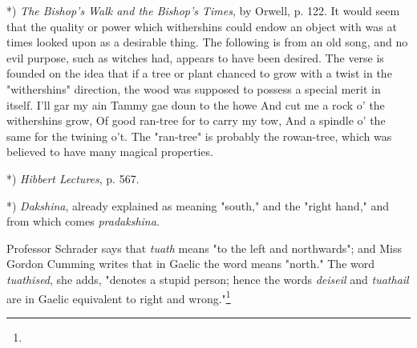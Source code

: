 \documentclass[a4paper, 11pt, oneside, polutonikogreek, english]{article}
\begin{document}
*) \emph{The Bishop's Walk and the Bishop's Times}, by Orwell, p. 122. It would seem that the quality or power which withershins could endow an object with was at times looked upon as a desirable thing. The following is from an old song, and no evil purpose, such as witches had, appears to have been desired. The verse is founded on the idea that if a tree or plant chanced to grow with a twist in the "withershins" direction, the wood was supposed to possess a special merit in itself.  
I'll gar my ain Tammy gae doun to the howe  
And cut me a rock o' the withershins grow,  
Of good ran-tree for to carry my tow,  
And a spindle o' the same for the twining o't.  
The "ran-tree" is probably the rowan-tree, which was believed to have many magical properties.


*) \emph{Hibbert Lectures}, p. 567.

*) \emph{Dakshina}, already explained as meaning "south," and the "right hand," and from which comes \emph{pradakshina}.

Professor Schrader says that \emph{tuath} means "to the left and northwards"; and Miss Gordon Cumming writes that in Gaelic the word means "north." The word \emph{tuathised}, she adds, "denotes a stupid person; hence the words \emph{deiseil} and \emph{tuathail} are in Gaelic equivalent to right and wrong."\footnote{}
\end{document}
